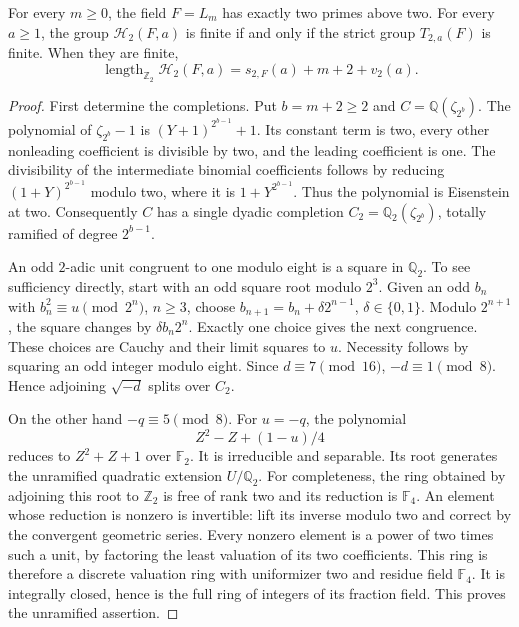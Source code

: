 \begin{srproposition}\label{prop:sr-H2-exact}
For every \(m\geq0\), the field \(F=L_m\) has exactly two primes above two.
For every
\(a\geq1\), the group \(\mathcal H_2(F,a)\) is finite if and only if
the strict group \(T_{2,a}(F)\) is finite. When they are finite,
\begin{equation}\label{eq:sr-H2-exact}
 \operatorname{length}_{\mathbb Z_2}\mathcal H_2(F,a)
                 =s_{2,F}(a)+m+2+v_2(a).
\end{equation}
\end{srproposition}
\begin{proof}
First determine the completions. Put \(b=m+2\geq2\) and \(C=\mathbb Q(\zeta_{2^b})\).
The polynomial of \(\zeta_{2^b}-1\) is
\((Y+1)^{2^{b-1}}+1\). Its constant term is two, every other
nonleading coefficient is divisible by two, and the leading coefficient
is one. The divisibility of the intermediate binomial coefficients
follows by reducing \((1+Y)^{2^{b-1}}\) modulo two, where it is
\(1+Y^{2^{b-1}}\). Thus the polynomial is Eisenstein at two.
Consequently \(C\) has a single dyadic completion
\(C_2=\mathbb Q_2(\zeta_{2^b})\), totally ramified of degree \(2^{b-1}\).

An odd \(2\)-adic unit congruent to one modulo eight is a square in
\(\mathbb Q_2\). To see sufficiency directly, start with an odd square
root modulo \(2^3\). Given an odd \(b_n\) with
\(b_n^2\equiv u\pmod {2^n}\), \(n\geq3\), choose
\(b_{n+1}=b_n+\delta 2^{n-1}\), \(\delta\in\{0,1\}\).
Modulo \(2^{n+1}\), the square changes by \(\delta b_n2^n\).
Exactly one choice gives the next congruence. These choices are Cauchy
and their limit squares to \(u\).
Necessity follows by squaring an odd integer modulo eight.
Since \(d\equiv7\pmod {16}\), \(-d\equiv1\pmod8\).
Hence adjoining \(\sqrt{-d}\) splits over \(C_2\).

On the other hand \(-q\equiv5\pmod8\).
For \(u=-q\), the polynomial
\[
                 Z^2-Z+(1-u)/4
\]
reduces to \(Z^2+Z+1\) over \(\mathbb F_2\).
It is irreducible and separable. Its root generates the unramified
quadratic extension \(U/\mathbb Q_2\).
For completeness, the ring obtained by adjoining this root to
\(\mathbb Z_2\) is free of rank two and its reduction is
\(\mathbb F_4\). An element whose reduction is nonzero is invertible:
lift its inverse modulo two and correct by the convergent geometric
series. Every nonzero element is a power of two times such a unit,
by factoring the least valuation of its two coefficients.
This ring is therefore a discrete valuation ring with uniformizer two
and residue field \(\mathbb F_4\). It is integrally closed, hence is
the full ring of integers of its fraction field. This proves the
unramified assertion.


\end{proof}
